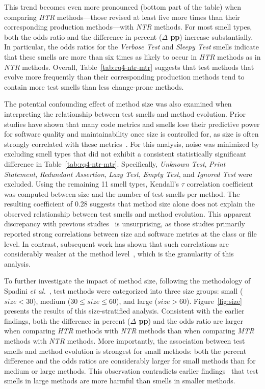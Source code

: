 This trend becomes even more pronounced (bottom part of the table) when comparing \emph{HTR} methods—those revised at least five more times than their corresponding production methods—with \emph{NTR} methods. For most smell types, both the odds ratio and the difference in percent (\textbf{$\Delta$ pp}) increase substantially. In particular, the odds ratios for the \emph{Verbose Test} and \emph{Sleepy Test} smells indicate that these smells are more than six times as likely to occur in \emph{HTR} methods as in \emph{NTR} methods. Overall, Table~\ref{tab:rq4-ntr-mtr} suggests that test methods that evolve more frequently than their corresponding production methods tend to contain more test smells than less change-prone methods.

The potential confounding effect of method size was also examined when interpreting the relationship between test smells and method evolution. Prior studies have shown that many code metrics and smells lose their predictive power for software quality and maintainability once size is controlled for, as size is often strongly correlated with these metrics~\cite{Emam:2001,Gil:2017,TSE:2013}. For this analysis, noise was minimized by excluding smell types that did not exhibit a consistent statistically significant difference in Table~\ref{tab:rq4-ntr-mtr}. Specifically, \emph{Unknown Test}, \emph{Print Statement}, \emph{Redundant Assertion}, \emph{Lazy Test}, \emph{Empty Test}, and \emph{Ignored Test} were excluded. Using the remaining 11 smell types, Kendall's $\tau$ correlation coefficient was computed between size and the number of test smells per method. The resulting coefficient of 0.28 suggests that method size alone does not explain the observed relationship between test smells and method evolution. This apparent discrepancy with previous studies~\cite{Emam:2001,Gil:2017,TSE:2013} is unsurprising, as those studies primarily reported strong correlations between size and software metrics at the class or file level. In contrast, subsequent work has shown that such correlations are considerably weaker at the method level~\cite{Landman:2014,chowdhury:2022}, which is the granularity of this analysis.

To further investigate the impact of method size, following the methodology of Spadini \textit{et al.}~\cite{Spadini:2018}, test methods were categorized into three size groups: small ($size < 30$), medium ($30 \leq size \leq 60$), and large ($size > 60$). Figure~\ref{fig:size} presents the results of this size-stratified analysis. Consistent with the earlier findings, both the difference in percent (\textbf{$\Delta$ pp}) and the odds ratio are larger when comparing \emph{HTR} methods with \emph{NTR} methods than when comparing \emph{MTR} methods with \emph{NTR} methods. More importantly, the association between test smells and method evolution is strongest for small methods: both the percent difference and the odds ratios are considerably larger for small methods than for medium or large methods. This observation contradicts earlier findings~\cite{Spadini:2018} that test smells in large methods are more harmful than smells in smaller methods.


